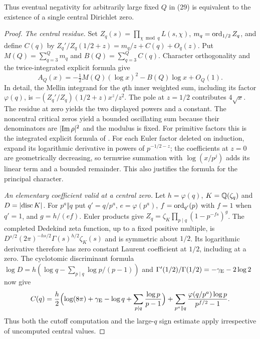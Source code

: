 Thus eventual negativity for arbitrarily large fixed $Q$ in (29) is equivalent to the
existence of a single central Dirichlet zero.

\begin{proof}
\emph{The central residue.} Set $Z_q(s)=\prod_{\chi\bmod q}L(s,\chi)$,
$m_q=\operatorname{ord}_{1/2}Z_q$, and define $C(q)$ by
$Z_q'/Z_q(1/2+z)=m_q/z+C(q)+O_q(z)$. Put $M(Q)=\sum_{q=3}^Qm_q$ and
$B(Q)=\sum_{q=3}^QC(q)$. Character orthogonality and the twice-integrated explicit formula
give
\begin{equation}\label{zer:eq:AQ}
 A_Q(x)=-\tfrac12M(Q)(\log x)^2-B(Q)\log x+O_Q(1).
\end{equation}
In detail, the Mellin integrand for the $q$th inner weighted sum, including its factor
$\varphi(q)$, is $-(Z_q'/Z_q)(1/2+z)x^z/z^2$. The pole at $z=1/2$ contributes $4\sqrt x$.
The residue at zero yields the two displayed powers and a constant. The noncentral critical
zeros yield a bounded oscillating sum because their denominators are $\lvert\operatorname{Im}\rho\rvert^2$ and
the modulus is fixed. For primitive factors this is the integrated explicit formula of
\cite[\S\S3.1, 4.1, 5.1]{Suzuki2025Variants}. For each Euler factor deleted on induction,
expand its logarithmic derivative in powers of $p^{-1/2-z}$; the coefficients at $z=0$ are
geometrically decreasing, so termwise summation with $\log(x/p^j)$ adds its linear term and
a bounded remainder. This also justifies the formula for the principal character.

\emph{An elementary coefficient valid at a central zero.} Let $h=\varphi(q)$,
$K=\mathbb{Q}(\zeta_q)$ and $D=\lvert\operatorname{disc} K\rvert$. For $p^a\Vert q$ put $q'=q/p^a$, $e=\varphi(p^a)$,
$f=\operatorname{ord}_{q'}(p)$ with $f=1$ when $q'=1$, and $g=h/(ef)$. Euler products give
$Z_q=\zeta_K\prod_{p\mid q}(1-p^{-fs})^g$. The completed Dedekind zeta function, up to a
fixed positive multiple, is $D^{s/2}(2\pi)^{-hs/2}\Gamma(s)^{h/2}\zeta_K(s)$ and is
symmetric about $1/2$. Its logarithmic derivative therefore has zero constant Laurent
coefficient at $1/2$, including at a zero. The cyclotomic discriminant formula
$\log D=h(\log q-\sum_{p\mid q}\log p/(p-1))$ and
$\Gamma'(1/2)/\Gamma(1/2)=-\gamma_{\mathrm{E}}-2\log2$ now give
\begin{equation}\label{zer:eq:Cq}
 C(q)=\frac h2\Bigl(\log(8\pi)+\gamma_{\mathrm{E}}-\log q+\sum_{p\mid q}\frac{\log p}{p-1}\Bigr)
 +\sum_{p^a\Vert q}\frac{\varphi(q/p^a)\log p}{p^{f/2}-1}.
\end{equation}
Thus both the cutoff computation and the large-$q$ sign estimate apply irrespective of
uncomputed central values.


\end{proof}
